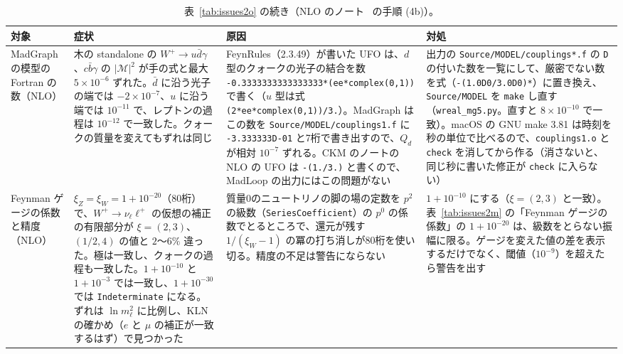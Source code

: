 \documentclass[a4paper,10pt]{ltjsarticle}
\begin{document}
\begin{table}[tbp]
\centering\footnotesize
\caption{表~\ref{tab:issues2o} の続き（NLO のノート~\cite{smnlonote} の手順 (4b)）。}
\label{tab:issues2p}
\begin{tabularx}{\linewidth}{>{\raggedright\arraybackslash}p{2.4cm}>{\raggedright\arraybackslash}X>{\raggedright\arraybackslash}X>{\raggedright\arraybackslash}X}
\toprule
\textbf{対象} & \textbf{症状} & \textbf{原因} & \textbf{対処} \\
\midrule
MadGraph の模型の Fortran の数（NLO） & 木の standalone の $W^+\to u\bar d\gamma$、$c\bar b\gamma$ の $|\mathcal M|^2$ が手の式と最大 $5\times10^{-6}$ ずれた。$\bar d$ に沿う光子の端では $-2\times10^{-7}$、$u$ に沿う端では $10^{-11}$ で、レプトンの過程は $10^{-12}$ で一致した。クォークの質量を変えてもずれは同じ & FeynRules（2.3.49）が書いた UFO は、$d$ 型のクォークの光子の結合を数 \texttt{-0.3333333333333333*}\allowbreak\texttt{(ee*complex(0,1))} で書く（$u$ 型は式 \texttt{(2*ee*complex(0,1))/3.}）。MadGraph はこの数を \texttt{Source/MODEL/couplings1.f} に \texttt{-3.333333D-01} と7桁で書き出すので、$Q_d$ が相対 $10^{-7}$ ずれる。CKM のノートの NLO の UFO は \texttt{-(1./3.)} と書くので、MadLoop の出力にはこの問題がない & 出力の \texttt{Source/MODEL/couplings*.f} の \texttt{D} の付いた数を一覧にして、厳密でない数を式（\texttt{-(1.0D0/3.0D0)*}）に置き換え、\texttt{Source/MODEL} を \texttt{make} し直す（\texttt{wreal\_mg5.py}。直すと $8\times10^{-10}$ で一致）。macOS の GNU make 3.81 は時刻を秒の単位で比べるので、\texttt{couplings1.o} と \texttt{check} を消してから作る（消さないと、同じ秒に書いた修正が \texttt{check} に入らない） \\
Feynman ゲージの係数と精度（NLO） & $\xi_Z=\xi_W=1+10^{-20}$（80桁）で、$W^+\to\nu_\ell\ell^+$ の仮想の補正の有限部分が $\xi=(2,3)$、$(1/2,4)$ の値と $2$〜$6\%$ 違った。極は一致し、クォークの過程も一致した。$1+10^{-10}$ と $1+10^{-3}$ では一致し、$1+10^{-30}$ では \texttt{Indeterminate} になる。ずれは $\ln m_\ell^2$ に比例し、KLN の確かめ（$e$ と $\mu$ の補正が一致するはず）で見つかった & 質量0のニュートリノの脚の場の定数を $p^2$ の級数（\texttt{SeriesCoefficient}）の $p^0$ の係数でとるところで、還元が残す $1/(\xi_W-1)$ の冪の打ち消しが80桁を使い切る。精度の不足は警告にならない & $1+10^{-10}$ にする（$\xi=(2,3)$ と一致）。表~\ref{tab:issues2m} の「Feynman ゲージの係数」の $1+10^{-20}$ は、級数をとらない振幅に限る。ゲージを変えた値の差を表示するだけでなく、閾値（$10^{-9}$）を超えたら警告を出す \\
\bottomrule
\end{tabularx}
\end{table}
\end{document}
